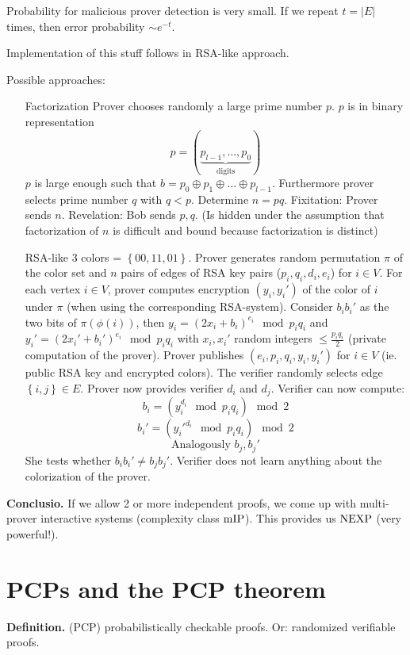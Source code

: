 \documentclass[a4paper]{article}
\newcommand{\cls}[1]{\rm{#1}}
\newcommand{\set}[1]{\left\{#1\right\}}
\begin{document}
Probability for malicious prover detection is very small.
If we repeat $t = |E|$ times, then error probability $\sim e^{-t}$.

Implementation of this stuff follows in RSA-like approach.

Possible approaches:
\begin{itemize}
  \item[Factorization]
    Prover chooses randomly a large prime number $p$. $p$ is in binary representation
    \[
      p = (\underbrace{p_{l-1}, \ldots, p_0}_{\text{digits}})
    \]
    $p$ is large enough such that $b = p_0 \oplus p_1 \oplus \ldots \oplus p_{l-1}$.
    Furthermore prover selects prime number $q$ with $q < p$. Determine $n = pq$.
    Fixitation: Prover sends $n$. Revelation: Bob sends $p, q$.
    (Is hidden under the assumption that factorization of $n$ is difficult
    and bound because factorization is distinct)
  \item[RSA-like]
    3 colors = $\set{00, 11, 01}$. Prover generates random permutation $\pi$
    of the color set and $n$ pairs of edges of RSA key pairs
    ($p_i, q_i, d_i, e_i$) for $i \in V$. For each vertex $i \in V$,
    prover computes encryption $(y_i, y_i')$ of the color of $i$ under $\pi$
    (when using the corresponding RSA-system).
    Consider $b_i b_i'$ as the two bits of $\pi(\phi(i))$, then
    $y_i = (2x_i + b_i)^{e_i} \mod{p_i q_i}$ and $y_i' = (2x_i' + b_i')^{e_i}
    \mod{p_i q_i}$ with $x_i, x_i'$ random integers $\leq \frac{p_i q_i}{2}$
    (private computation of the prover).
    Prover publishes $(e_i, p_i, q_i, y_i, y_i')$ for $i \in V$
    (ie. public RSA key and encrypted colors).
    The verifier randomly selects edge $\set{i,j} \in E$. Prover now
    provides verifier $d_i$ and $d_j$.
    Verifier can now compute:
    \[
      b_i = (y_i^{d_i} \mod{p_i q_i}) \mod{2}
    \] \[
      b_i' = ({y_i'}^{d_i} \mod{p_i q_i}) \mod{2}
    \] \[
      \text{Analogously } b_j, b_j'
    \]
    She tests whether $b_i b_i' \neq b_j b_j'$.
    Verifier does not learn anything about the colorization of the prover.
\end{itemize}

\textbf{Conclusio.}
If we allow 2 or more independent proofs, we come up with multi-prover
interactive systems (complexity class $\cls{mIP}$). This provides us
$\cls{NEXP}$ (very powerful!).

\section{PCPs and the PCP theorem}
%
\textbf{Definition.} (PCP)
  probabilistically checkable proofs.
  Or: randomized verifiable proofs.
\end{document}
